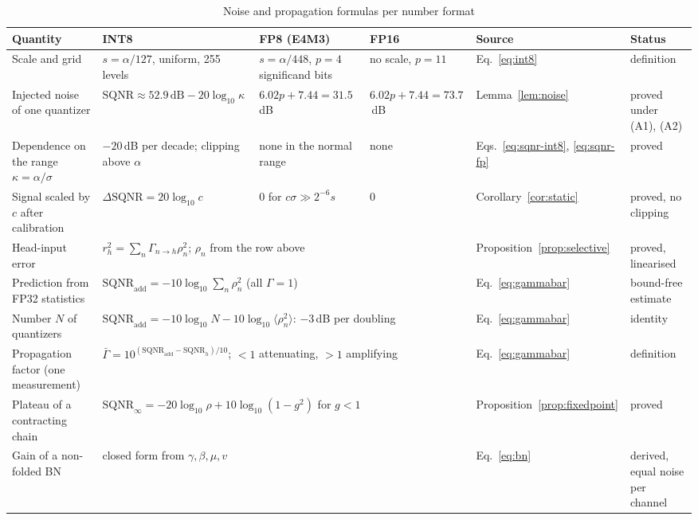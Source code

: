 \documentclass[pdflatex,sn-mathphys-num]{sn-jnl}%
\theoremstyle{thmstyleone}%
\theoremstyle{thmstyletwo}%
\theoremstyle{thmstylethree}%
\begin{document}
\begin{appendices}
\begin{table}
\footnotesize\setlength{\tabcolsep}{4pt}
\caption{Noise and propagation formulas per number format}\label{tab:formulas}
\begin{tabular}{@{}p{3.3cm}p{3.6cm}p{3.1cm}p{2.0cm}p{2.7cm}p{2.6cm}@{}}
\toprule
Quantity & INT8 & FP8 (E4M3) & FP16 & Source & Status \\
\midrule
Scale and grid & $s=\alpha/127$, uniform, 255 levels & $s=\alpha/448$, $p=4$ significand bits & no scale, $p=11$ & Eq.~\eqref{eq:int8} & definition \\
Injected noise of one quantizer & $\mathrm{SQNR}\approx52.9\,\mathrm{dB}-20\log_{10}\kappa$ & $6.02p+7.44=31.5$\,dB & $6.02p+7.44=73.7$\,dB & Lemma~\ref{lem:noise} & proved under (A1), (A2) \\
Dependence on the range $\kappa=\alpha/\sigma$ & $-20$\,dB per decade; clipping above $\alpha$ & none in the normal range & none & Eqs.~\eqref{eq:sqnr-int8}, \eqref{eq:sqnr-fp} & proved \\
Signal scaled by $c$ after calibration & $\Delta\mathrm{SQNR}=20\log_{10}c$ & $0$ for $c\sigma\gg2^{-6}s$ & $0$ & Corollary~\ref{cor:static} & proved, no clipping \\
Head-input error & \multicolumn{3}{p{9.1cm}}{$r_h^2=\sum_n\Gamma_{n\to h}\rho_n^2$; $\rho_n$ from the row above} & Proposition~\ref{prop:selective} & proved, linearised \\
Prediction from FP32 statistics & \multicolumn{3}{p{9.1cm}}{$\mathrm{SQNR}_\text{add}=-10\log_{10}\sum_n\rho_n^2$ (all $\Gamma=1$)} & Eq.~\eqref{eq:gammabar} & bound-free estimate \\
Number $N$ of quantizers & \multicolumn{3}{p{9.1cm}}{$\mathrm{SQNR}_\text{add}=-10\log_{10}N-10\log_{10}\langle\rho_n^2\rangle$: $-3$\,dB per doubling} & Eq.~\eqref{eq:gammabar} & identity \\
Propagation factor (one measurement) & \multicolumn{3}{p{9.1cm}}{$\bar\Gamma=10^{(\mathrm{SQNR}_\text{add}-\mathrm{SQNR}_h)/10}$; $<1$ attenuating, $>1$ amplifying} & Eq.~\eqref{eq:gammabar} & definition \\
Plateau of a contracting chain & \multicolumn{3}{p{9.1cm}}{$\mathrm{SQNR}_\infty=-20\log_{10}\rho+10\log_{10}(1-g^2)$ for $g<1$} & Proposition~\ref{prop:fixedpoint} & proved \\
Gain of a non-folded BN & \multicolumn{3}{p{9.1cm}}{closed form from $\gamma,\beta,\mu,v$} & Eq.~\eqref{eq:bn} & derived, equal noise per channel \\

\end{tabular}
\end{table}
\end{appendices}
\end{document}
